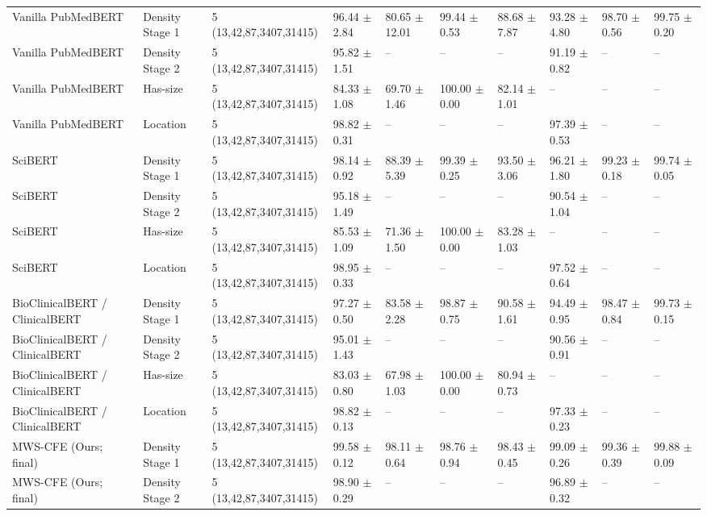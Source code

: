 \begin{table}[t]
{\begin{tabular}{llllllllll}
Vanilla PubMedBERT & Density Stage 1 & 5 (13,42,87,3407,31415) & 96.44 $\pm$ 2.84 & 80.65 $\pm$ 12.01 & 99.44 $\pm$ 0.53 & 88.68 $\pm$ 7.87 & 93.28 $\pm$ 4.80 & 98.70 $\pm$ 0.56 & 99.75 $\pm$ 0.20 \\
Vanilla PubMedBERT & Density Stage 2 & 5 (13,42,87,3407,31415) & 95.82 $\pm$ 1.51 & -- & -- & -- & 91.19 $\pm$ 0.82 & -- & -- \\
Vanilla PubMedBERT & Has-size & 5 (13,42,87,3407,31415) & 84.33 $\pm$ 1.08 & 69.70 $\pm$ 1.46 & 100.00 $\pm$ 0.00 & 82.14 $\pm$ 1.01 & -- & -- & -- \\
Vanilla PubMedBERT & Location & 5 (13,42,87,3407,31415) & 98.82 $\pm$ 0.31 & -- & -- & -- & 97.39 $\pm$ 0.53 & -- & -- \\
SciBERT & Density Stage 1 & 5 (13,42,87,3407,31415) & 98.14 $\pm$ 0.92 & 88.39 $\pm$ 5.39 & 99.39 $\pm$ 0.25 & 93.50 $\pm$ 3.06 & 96.21 $\pm$ 1.80 & 99.23 $\pm$ 0.18 & 99.74 $\pm$ 0.05 \\
SciBERT & Density Stage 2 & 5 (13,42,87,3407,31415) & 95.18 $\pm$ 1.49 & -- & -- & -- & 90.54 $\pm$ 1.04 & -- & -- \\
SciBERT & Has-size & 5 (13,42,87,3407,31415) & 85.53 $\pm$ 1.09 & 71.36 $\pm$ 1.50 & 100.00 $\pm$ 0.00 & 83.28 $\pm$ 1.03 & -- & -- & -- \\
SciBERT & Location & 5 (13,42,87,3407,31415) & 98.95 $\pm$ 0.33 & -- & -- & -- & 97.52 $\pm$ 0.64 & -- & -- \\
BioClinicalBERT / ClinicalBERT & Density Stage 1 & 5 (13,42,87,3407,31415) & 97.27 $\pm$ 0.50 & 83.58 $\pm$ 2.28 & 98.87 $\pm$ 0.75 & 90.58 $\pm$ 1.61 & 94.49 $\pm$ 0.95 & 98.47 $\pm$ 0.84 & 99.73 $\pm$ 0.15 \\
BioClinicalBERT / ClinicalBERT & Density Stage 2 & 5 (13,42,87,3407,31415) & 95.01 $\pm$ 1.43 & -- & -- & -- & 90.56 $\pm$ 0.91 & -- & -- \\
BioClinicalBERT / ClinicalBERT & Has-size & 5 (13,42,87,3407,31415) & 83.03 $\pm$ 0.80 & 67.98 $\pm$ 1.03 & 100.00 $\pm$ 0.00 & 80.94 $\pm$ 0.73 & -- & -- & -- \\
BioClinicalBERT / ClinicalBERT & Location & 5 (13,42,87,3407,31415) & 98.82 $\pm$ 0.13 & -- & -- & -- & 97.33 $\pm$ 0.23 & -- & -- \\
MWS-CFE (Ours; final) & Density Stage 1 & 5 (13,42,87,3407,31415) & 99.58 $\pm$ 0.12 & 98.11 $\pm$ 0.64 & 98.76 $\pm$ 0.94 & 98.43 $\pm$ 0.45 & 99.09 $\pm$ 0.26 & 99.36 $\pm$ 0.39 & 99.88 $\pm$ 0.09 \\
MWS-CFE (Ours; final) & Density Stage 2 & 5 (13,42,87,3407,31415) & 98.90 $\pm$ 0.29 & -- & -- & -- & 96.89 $\pm$ 0.32 & -- & -- \\

\end{tabular}}
\end{table}
